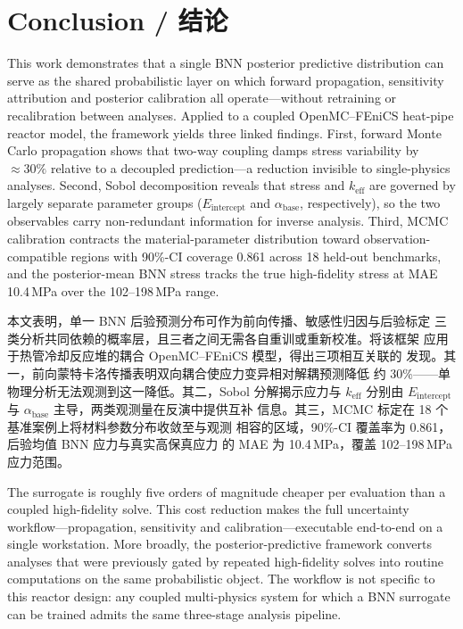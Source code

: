 \documentclass[11pt,a4paper]{article}
\newcommand{\keff}{\ensuremath{k_{\mathrm{eff}}}}
\newcommand{\Eint}{\ensuremath{E_{\mathrm{intercept}}}}
\newcommand{\abase}{\ensuremath{\alpha_{\mathrm{base}}}}
\begin{document}
\section{Conclusion / 结论}

This work demonstrates that a single BNN posterior predictive
distribution can serve as the shared probabilistic layer on which
forward propagation, sensitivity attribution and posterior calibration
all operate---without retraining or recalibration between analyses.
Applied to a coupled OpenMC--FEniCS heat-pipe reactor model, the
framework yields three linked findings. First, forward Monte Carlo
propagation shows that two-way coupling damps stress variability by
${\approx}30\%$ relative to a decoupled prediction---a reduction
invisible to single-physics analyses. Second, Sobol decomposition
reveals that stress and \keff{} are governed by largely separate
parameter groups (\Eint{} and \abase{}, respectively), so the two
observables carry non-redundant information for inverse analysis. Third,
MCMC calibration contracts the material-parameter distribution toward
observation-compatible regions with 90\%-CI coverage 0.861 across 18
held-out benchmarks, and the posterior-mean BNN stress tracks the true
high-fidelity stress at MAE 10.4\,MPa over the 102--198\,MPa range.

本文表明，单一 BNN 后验预测分布可作为前向传播、敏感性归因与后验标定
三类分析共同依赖的概率层，且三者之间无需各自重训或重新校准。将该框架
应用于热管冷却反应堆的耦合 OpenMC--FEniCS 模型，得出三项相互关联的
发现。其一，前向蒙特卡洛传播表明双向耦合使应力变异相对解耦预测降低
约 30\%——单物理分析无法观测到这一降低。其二，Sobol 分解揭示应力与
\keff{} 分别由 \Eint{} 与 \abase{} 主导，两类观测量在反演中提供互补
信息。其三，MCMC 标定在 18 个基准案例上将材料参数分布收敛至与观测
相容的区域，90\%-CI 覆盖率为 0.861，后验均值 BNN 应力与真实高保真应力
的 MAE 为 10.4\,MPa，覆盖 102--198\,MPa 应力范围。

The surrogate is roughly five orders of magnitude cheaper per evaluation
than a coupled high-fidelity solve. This cost reduction makes the full
uncertainty workflow---propagation, sensitivity and calibration---executable
end-to-end on a single workstation. More broadly, the posterior-predictive
framework converts analyses that were previously gated by repeated
high-fidelity solves into routine computations on the same probabilistic
object. The workflow is not specific to this reactor design: any coupled
multi-physics system for which a BNN surrogate can be trained admits the
same three-stage analysis pipeline.
\end{document}
